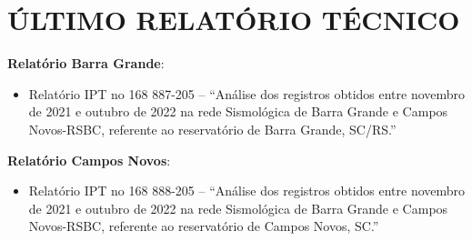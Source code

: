 \section{ÚLTIMO RELATÓRIO TÉCNICO}
\label{section:ultimo_relatorio}
\textbf{Relatório Barra Grande}:

\begin{itemize}
\item Relatório IPT no 168 887-205 – “Análise dos registros obtidos entre novembro de 2021 e outubro de 2022 na rede Sismológica de Barra Grande e Campos Novos-RSBC, referente ao reservatório de Barra Grande, SC/RS.”
\end{itemize}

\textbf{Relatório Campos Novos}:
\begin{itemize}
    \item Relatório IPT no 168 888-205 – “Análise dos registros obtidos entre novembro de 2021 e outubro de 2022 na rede Sismológica de Barra Grande e Campos Novos-RSBC, referente ao reservatório de Campos Novos, SC.”
\end{itemize}
